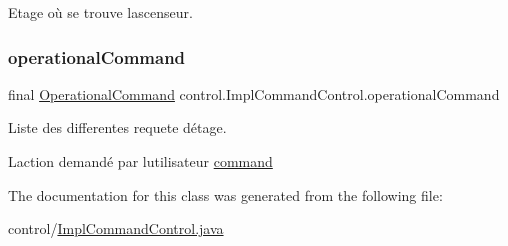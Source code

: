 Etage où se trouve l\textquotesingle{}ascenseur. 

\mbox{\label{classcontrol_1_1_impl_command_control_adbe2ee9057a11e4d2408947f5ff83cd5}} 
\subsubsection{\texorpdfstring{operationalCommand}{operationalCommand}}
{\footnotesize\ttfamily final \mbox{\hyperlink{interfacecontrol_1_1_operational_command}{Operational\+Command}} control.\+Impl\+Command\+Control.\+operational\+Command\hspace{0.3cm}{\ttfamily [private]}}



Liste des differentes requete d\textquotesingle{}étage. 

L\textquotesingle{}action demandé par l\textquotesingle{}utilisateur \mbox{\hyperlink{namespacecontrol_1_1command}{command}} 

The documentation for this class was generated from the following file\+:\begin{DoxyCompactItemize}
\item 
control/\mbox{\hyperlink{_impl_command_control_8java}{Impl\+Command\+Control.\+java}}\end{DoxyCompactItemize}
